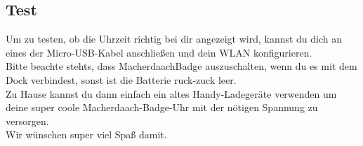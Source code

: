 \documentclass{article}
\begin{document}
\subsection{Test}

Um zu testen, ob die Uhrzeit richtig bei dir angezeigt wird, kannst du dich an eines der Micro-USB-Kabel anschließen und dein WLAN konfigurieren.\\

Bitte beachte stehts, dass MacherdaachBadge auszuschalten, wenn du es mit dem Dock verbindest, sonst ist die Batterie ruck-zuck leer.\\

Zu Hause kannst du dann einfach ein altes Handy-Ladegeräte verwenden um deine super coole Macherdaach-Badge-Uhr mit der nötigen Spannung zu versorgen.\\

Wir wünschen super viel Spaß damit.



\end{document}
